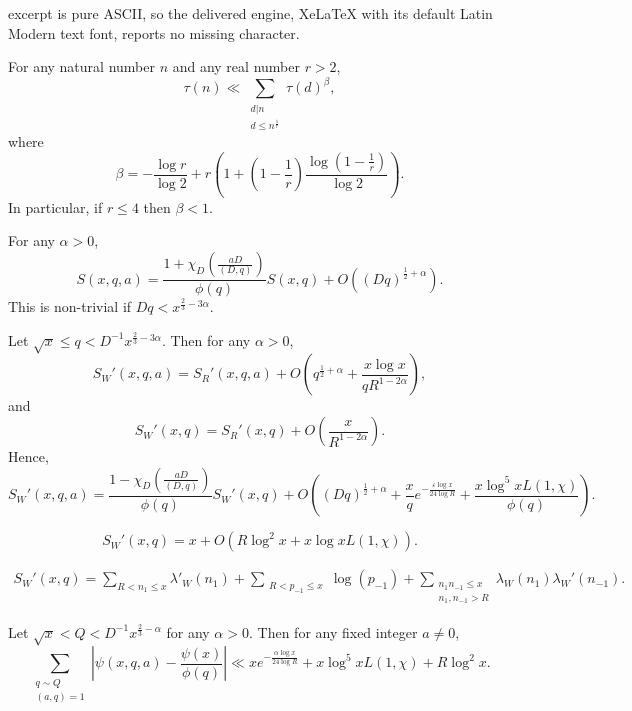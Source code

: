 \documentclass[10pt,a4paper]{amsart}
\begin{document}
excerpt is pure ASCII, so the delivered engine, XeLaTeX with its default Latin Modern text font, reports no missing character.
\begin{lemma}[Munshi, 2011]\label{Mun}
For any natural number $n$ and any real number $r>2$,
$$\tau(n)\ll \sum_{\substack{d|n \\ d\leq n^\frac 1r}}\tau(d)^\beta,$$
where
$$\beta=-\frac{\log r}{\log 2}+r\left(1+\left(1-\frac 1r\right)\frac{\log\left(1-\frac 1r\right)}{\log 2}\right).$$
In particular, if $r\leq 4$ then $\beta<1$.
\end{lemma}

\begin{lemma}\label{lambdaap} For any $\alpha>0$,
$$S(x,q,a)=\frac{1+\chi_D\left(\frac{aD}{(D,q)}\right)}{\phi(q)}S(x,q)+O\left((Dq)^{\frac 12+\alpha}\right).$$
This is non-trivial if $Dq<x^{\frac 23-3\alpha}$.
\end{lemma}

\begin{lemma}\label{DW}
Let $\sqrt x\leq q<D^{-1}x^{\frac 23-3\alpha}$.  Then for any $\alpha>0$,
$$S_W'(x,q,a)=S_R'(x,q,a)+O\left(q^{\frac 12+\alpha}+\frac{x\log x}{qR^{1-2\alpha}}\right),$$
and
$$S_W'(x,q)=S_R'(x,q)+O\left(\frac{x}{R^{1-2\alpha}}\right).$$
Hence,
$$S_W'(x,q,a)=\frac{1-\chi_D\left(\frac{aD}{(D,q)}\right)}{\phi(q)}S_W'(x,q)+O\left((Dq)^{\frac 12+\alpha}+\frac xqe^{-\frac{\varepsilon\log x}{24\log R}}+\frac{x\log^5 xL(1,\chi)}{\phi(q)}\right).$$

\end{lemma}

\begin{lemma}\label{SWx}
$$S_W'(x,q)=x+O\left(R\log^2 x+x\log xL(1,\chi)\right).$$
\end{lemma}

\begin{gather}\label{DWLambda}
S_W'(x,q)=\sum_{R<n_1\leq x}\lambda'_W\left(n_1\right)+\sum_{\substack{R<p_{-1}\leq x }}\log\left(p_{-1}\right)+\sum_{\substack{n_1n_{-1}\leq x \\ n_1,n_{-1}>R }}\lambda_W\left(n_1\right) \lambda_W'\left(n_{-1}\right).
\end{gather}

\begin{theorem}
Let $\sqrt x<Q<D^{-1}x^{\frac 23-\alpha}$ for any $\alpha>0$.  Then for any fixed integer $a\neq 0$,
$$\sum_{\substack{q\sim Q \\ (a,q)=1}}\left|\psi(x,q,a)-\frac{\psi(x)}{\phi(q)}\right|\ll xe^{-\frac{\alpha\log x}{24\log R}
}+x\log^5 xL(1,\chi)+R\log^2 x.$$
\end{theorem}
\end{document}

